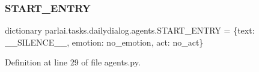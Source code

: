 \subsubsection{\texorpdfstring{S\+T\+A\+R\+T\+\_\+\+E\+N\+T\+RY}{START\_ENTRY}}
{\footnotesize\ttfamily dictionary parlai.\+tasks.\+dailydialog.\+agents.\+S\+T\+A\+R\+T\+\_\+\+E\+N\+T\+RY = \{\textquotesingle{}text\textquotesingle{}\+: \textquotesingle{}\+\_\+\+\_\+\+S\+I\+L\+E\+N\+C\+E\+\_\+\+\_\+\textquotesingle{}, \textquotesingle{}emotion\textquotesingle{}\+: \textquotesingle{}no\+\_\+emotion\textquotesingle{}, \textquotesingle{}act\textquotesingle{}\+: \textquotesingle{}no\+\_\+act\textquotesingle{}\}}



Definition at line 29 of file agents.\+py.

